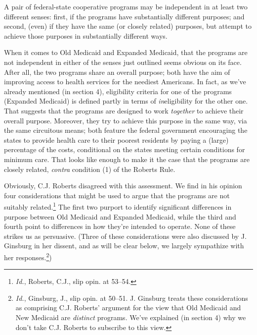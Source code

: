 \documentclass[
  11pt,
  letterpaper,
  DIV=11,
  numbers=noendperiod,
  twoside]{scrartcl}
\begin{document}
A pair of federal-state cooperative programs may be independent in at
least two different senses: first, if the programs have substantially
different purposes; and second, (even) if they have the same (or closely
related) purposes, but attempt to achieve those purposes in
substantially different ways.

When it comes to Old Medicaid and Expanded Medicaid, that the programs
are not independent in either of the senses just outlined seems obvious
on its face. After all, the two programs share an overall purpose; both
have the aim of improving access to health services for the neediest
Americans. In fact, as we've already mentioned (in section 4),
eligibility criteria for one of the programs (Expanded Medicaid) is
defined partly in terms of \emph{in}eligibility for the other one. That
suggests that the programs are designed to work \emph{together} to
achieve their overall purpose. Moreover, they try to achieve this
purpose in the same way, via the same circuitous means; both feature the
federal government encouraging the states to provide health care to
their poorest residents by paying a (large) percentage of the costs,
conditional on the states meeting certain conditions for minimum care.
That looks like enough to make it the case that the programs are closely
related, \emph{contra} condition (1) of the Roberts Rule.

Obviously, C.J. Roberts disagreed with this assessment. We find in his
opinion four considerations that might be used to argue that the
programs are not suitably related.\footnote{\emph{Id.}, Roberts, C.J.,
  slip opin. at 53--54.} The first two purport to identify significant
differences in purpose between Old Medicaid and Expanded Medicaid, while
the third and fourth point to differences in how they're intended to
operate. None of these strikes us as persuasive. (Three of these
considerations were also discussed by J. Ginsburg in her dissent, and as
will be clear below, we largely sympathize with her
responses.\footnote{\emph{Id.}, Ginsburg, J., slip opin. at 50--51. J.
  Ginsburg treats these considerations as comprising C.J. Roberts'
  argument for the view that Old Medicaid and New Medicaid are
  \emph{distinct} programs. We've explained (in section 4) why we don't
  take C.J. Roberts to subscribe to this view.})
\end{document}
